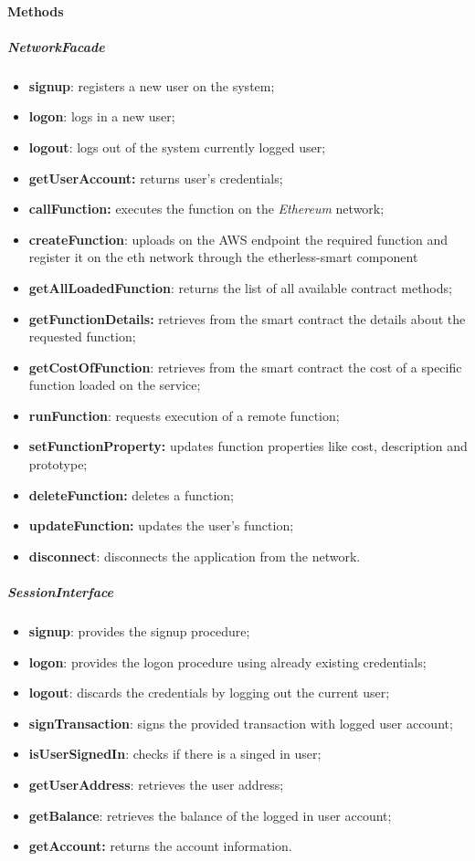 \paragraph{Methods}
\subparagraph{NetworkFacade}
\begin{itemize}
    \item \textbf{signup}: registers a new user on the system;
    \item \textbf{logon}: logs in a new user;
    \item \textbf{logout}: logs out of the system currently logged user;
    \item \textbf{getUserAccount:} returns user's credentials;
    \item \textbf{callFunction:} executes the function on the \textit{Ethereum} network;
    \item \textbf{createFunction}: uploads on the AWS endpoint the required function and register it on the eth network through the etherless-smart component
	\item \textbf{getAllLoadedFunction}: returns the list of all available contract methods;
	\item \textbf{getFunctionDetails:} retrieves from the smart contract the details about the requested function;
	\item \textbf{getCostOfFunction}: retrieves from the smart contract the cost of a specific function loaded on the service;
	\item \textbf{runFunction}: requests execution of a remote function;
	\item \textbf{setFunctionProperty:} updates function properties like cost, description and prototype;
	\item \textbf{deleteFunction:} deletes a function;
	\item \textbf{updateFunction:} updates the user's function;    
    \item \textbf{disconnect}: disconnects the application from the network.
\end{itemize}
\subparagraph{SessionInterface}
\begin{itemize}
    \item \textbf{signup}: provides the signup procedure;
    \item \textbf{logon}: provides the logon procedure using already existing credentials;
    \item \textbf{logout}: discards the credentials by logging out the current user;
    \item \textbf{signTransaction}: signs the provided transaction with logged user account;
    \item \textbf{isUserSignedIn}: checks if there is a singed in user;
    \item \textbf{getUserAddress}: retrieves the user address;
    \item \textbf{getBalance}: retrieves the balance of the logged in user account;
    \item \textbf{getAccount:} returns the account information.
\end{itemize}
